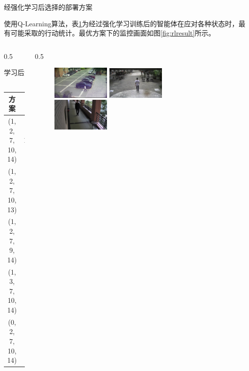     \begin{frame}{经强化学习后选择的部署方案}
    \begin{block}{}
    使用Q-Learning算法，表\ref{tab:rlresult}为经过强化学习训练后的智能体在应对各种状态时，最有可能采取的行动统计。最优方案下的监控画面如图\ref{fig:rlresult}所示。
    \end{block}
    \begin{columns}
        \begin{column}{0.5\textwidth}
            \begin{table}
                \centering
                \begin{tabular}{@{}ccc@{}}
                \toprule
                方案               & 频次  & 占比      \\ \midrule
                (1, 2, 7, 10, 14) & 190 & 65.97\% \\
                (1, 2, 7, 10, 13) & 78  & 27.08\% \\
                (1, 2, 7, 9, 14)  & 18  & 6.15\%  \\
                (1, 3, 7, 10, 14) & 1   & 0.35\%  \\
                (0, 2, 7, 10, 14) & 1   & 0.35\%  \\ \bottomrule
                \end{tabular}
                \caption{学习后选择的部署方案}
                \label{tab:rlresult}
            \end{table}
        \end{column}
        \begin{column}{0.5\textwidth}
            \begin{figure}
            \centering
            \includegraphics[width=0.3\textwidth]{figures/1-2}
            \includegraphics[width=0.3\textwidth]{figures/1-4}\\
            \includegraphics[width=0.3\textwidth]{figures/2-3}

\end{figure}
\end{column}
\end{columns}
\end{frame}
